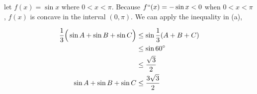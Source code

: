 \documentclass[10pt]{537homework}
\begin{document}
let $f(x) = \sin{x}$ where $ 0 < x < \pi$. Because $f``(x) = - \sin{x} < 0$ when $0 < x < \pi $, $f(x)$ is concave in the interval $(0, \pi)$. We can apply the inequality in (a),

\begin{align}
  {1 \over 3}\Big(\sin{A} + \sin{B} + \sin{C} \Big) & \leq \sin{{1\over3}(A + B + C)} \\
  & \leq \sin{60^{\circ}} \\
  & \leq {\sqrt{3} \over 2} \\
  \sin{A} + \sin{B} + \sin{C} & \leq {3\sqrt{3} \over 2} 
\end{align} 
\end{document}

